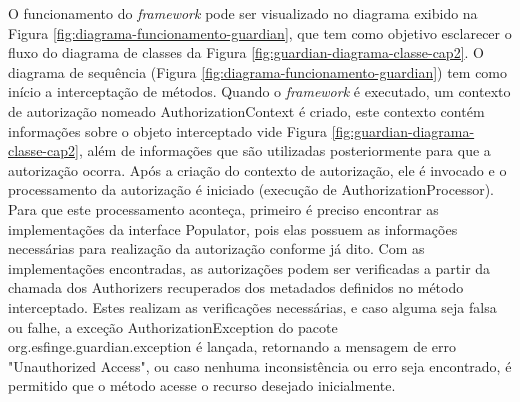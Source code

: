 \par O funcionamento do \textit{framework} pode ser visualizado no diagrama exibido na Figura \ref{fig:diagrama-funcionamento-guardian}, que tem como objetivo esclarecer o fluxo do diagrama de classes da Figura \ref{fig:guardian-diagrama-classe-cap2}. O diagrama de sequência (Figura \ref{fig:diagrama-funcionamento-guardian}) tem como início a interceptação de métodos. Quando o \textit{framework} é executado, um contexto de autorização nomeado AuthorizationContext é criado, este contexto contém informações sobre o objeto interceptado vide Figura \ref{fig:guardian-diagrama-classe-cap2}, além de informações que são utilizadas posteriormente para que a autorização ocorra. Após a criação do contexto de autorização, ele é invocado e o processamento da autorização é iniciado (execução de AuthorizationProcessor). Para que este processamento aconteça, primeiro é preciso encontrar as implementações da interface Populator, pois elas possuem as informações necessárias para realização da autorização conforme já dito. Com as implementações encontradas, as autorizações podem ser verificadas a partir da chamada dos Authorizers recuperados dos metadados definidos no método interceptado. Estes realizam as verificações necessárias, e caso alguma seja falsa ou falhe, a exceção AuthorizationException do pacote org.esfinge.guardian.exception é lançada, retornando a mensagem de erro "Unauthorized Access", ou caso nenhuma inconsistência ou erro seja encontrado, é permitido que o método acesse o recurso desejado inicialmente.

